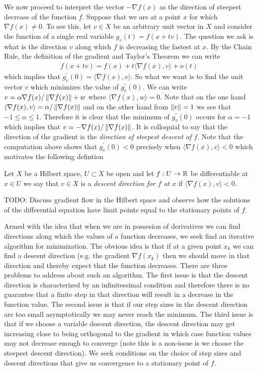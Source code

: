 We now proceed to interpret the vector $-\nabla f(x)$ as the
direction of steepest decrease of the function $f$.  Suppose
that we are at a point $x$ for which $\nabla f(x) \neq 0$.  To see
this, let $v \in X$ be an arbitrary unit vector in $X$ and consider the function of a single
real variable $g_v(t) = f(x + tv)$.  The question we ask is what is the
direction $v$ along which $f$ is decreasing the fastest at $x$.  By the Chain Rule, the definition of the
gradient and Taylor's Theorem we can write
\begin{align*}
f(x + tv) = f(x) + t \langle \nabla f(x), v \rangle + o(t)
\end{align*}
which implies that $g_v^\prime(0) = \langle \nabla f(x), v \rangle$.  So
what we want is to find the unit vector $v$ which minimizes the value
of $g_v^\prime(0)$.  We can write $v = \alpha \nabla f(x)/\left \lVert \nabla
  f(x) \right \rVert + w$ where $\langle \nabla f(x), w \rangle = 0$.  Note that on
the one hand $\langle \nabla f(x), v \rangle = \alpha/\left \lVert \nabla
  f(x) \right \rVert$ and on the other hand from $\left \lVert v \right \rVert = 1$ we see that $-1
\leq \alpha \leq 1$.  Therefore it is clear that the minimum of
$g_v^\prime(0)$ occurs for $\alpha = -1$ which implies that $v = -
\nabla f(x) /\left \lVert \nabla f(x) \right \rVert$. It is colloquial to say that the direction of
the gradient is the \emph{direction of steepest descent of $f$}.  Note
that the computation above shows that $g_v^\prime(0) < 0$ precisely
when $\langle \nabla f(x), v \rangle < 0$ which motivates the
following defintion
\begin{defn}Let $X$ be a Hilbert space, $U \subset X$ be open and let
  $f : U \to \mathbb{R}$ be differentiable at $x \in U$ we say that $v \in
  X$ is a \emph{descent direction for $f$ at $x$} if $\langle \nabla
  f(x) , v\rangle < 0$.
\end{defn}


TODO: Discuss gradient flow in the Hilbert space and observe how the
solutions of the differential equation have limit points equal to the
stationary points of $f$.

Armed with the idea that when we are in possesion of derivatives we can
find directions along which the values of a function decreases, we
seek find an iterative algorithm for minimization.  The obvious idea
is that if at a given point $x_k$ we can find a descent direction
(e.g. the gradient $\nabla f(x_k)$ then we should move in that
direction and thereby expect that the function decreases.  There are
three problems to address about such an algorithm.  The first issue is
that the descent direction is characterized by an infinitessimal
condition and therefore there is no guarantee that a finite step in
that direction will result in a decrease in the function value.  The
second issue is that if our step sizes in the descent direction are
too small asymptotically we may never reach the minimum.  The third
issue is that if we choose a variable descent direction, the descent
direction may get increasing close to being orthogonal to the gradient
in which case function values may not decrease enough to converge
(note this is a non-issue is we choose the steepest descent direction).  We
seek conditions on the choice of step sizes and descent directions
that give us convergence to a stationary point of $f$.



